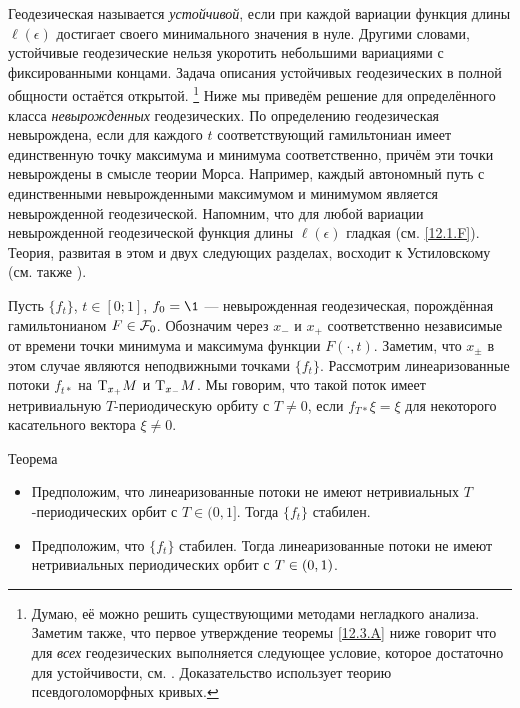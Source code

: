 Геодезическая называется \emph{устойчивой}, если при каждой вариации функция длины $\ell(\epsilon)$ достигает своего минимального значения в нуле.
Другими словами, устойчивые геодезические нельзя укоротить небольшими вариациями с фиксированными концами.
Задача описания устойчивых геодезических в полной общности остаётся открытой.%
\footnote{Думаю, её можно решить существующими методами негладкого анализа.
Заметим также, что первое утверждение теоремы \ref{12.3.A} ниже говорит что для {}\emph{всех} геодезических выполняется следующее условие, которое достаточно для устойчивости, см. \cite{LM3}.
Доказательство использует теорию псевдоголоморфных кривых.}
Ниже мы приведём решение для определённого класса \emph{невырожденных} геодезических.
По определению геодезическая невырождена, если для каждого $t$ соответствующий гамильтониан имеет единственную точку максимума и минимума соответственно, причём эти точки невырождены в смысле теории Морса.
Например, каждый автономный путь с единственными невырожденными максимумом и минимумом является невырожденной геодезической.
Напомним, что для любой вариации невырожденной геодезической функция длины $\ell(\epsilon)$ гладкая (см. \ref{12.1.F}).
Теория, развитая в этом и двух следующих разделах, восходит к Устиловскому \cite{U} (см. также \cite{LM2}).

Пусть $\{f_t\}$, $t \in [0; 1]$, $f_0 = \1$ --- невырожденная геодезическая, порождённая гамильтонианом $F\in \mathcal{F}_0$.
Обозначим через $x_-$ и $x_+$ соответственно независимые от времени точки минимума и максимума функции $F(\cdot, t)$.
Заметим, что $x_\pm$ в этом случае являются неподвижными точками $\{f_t\}$.
Рассмотрим линеаризованные потоки $f_{t*}$ на $\mathrm{T}_{x_+}M$ и $\mathrm{T}_{x_-}M$.
Мы говорим, что такой поток имеет нетривиальную $T$-периодическую орбиту с $T\ne0$, если $f_{T*}\xi=\xi$ для некоторого касательного вектора $\xi\ne0$.

\begin{thm}[(\cite{U})]{Теорема}\label{12.3.A}

\begin{itemize}
\item Предположим, что линеаризованные потоки не имеют нетривиальных $T$-периодических орбит с $T\in(0,1]$.
Тогда $\{f_t\}$ стабилен.
\item Предположим, что $\{f_t\}$ стабилен.
Тогда линеаризованные потоки не имеют нетривиальных периодических орбит с $T\z\in(0,1)$.
\end{itemize}
\end{thm}


